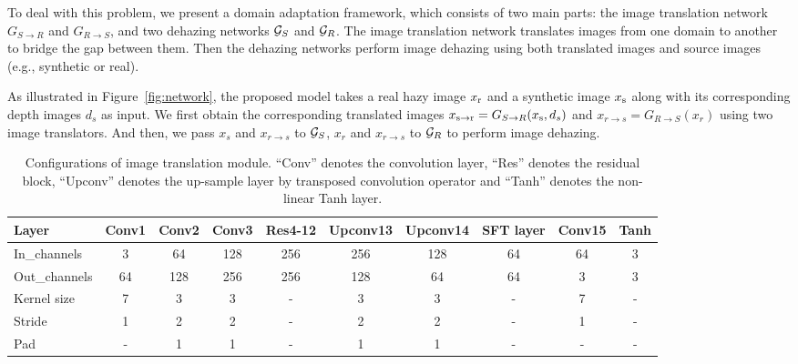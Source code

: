 \documentclass[10pt,twocolumn,letterpaper]{article}
\begin{document}
To deal with this problem, we present a domain adaptation framework, which consists of two main parts: the image translation network ${G_{S \to R}}$ and ${G_{R \to S}}$, and two dehazing networks ${{\cal G}_S}$ and ${{\cal G}_R}$. 
The image translation network translates images from one domain to another to bridge the gap between them.
Then the dehazing networks perform image dehazing using both translated images and source images (e.g., synthetic or real).

As illustrated in Figure~\ref{fig:network}, the proposed model takes a real hazy image ${x_{\rm{r}}}$ and a synthetic image ${x_{\rm{s}}}$ along with its corresponding depth images ${d_s}$ as input. 
We first obtain the corresponding translated images ${x_{{\rm{s}} \to {\rm{r}}}} = {G_{S \to R}}({x_{\rm{s}}},{d_s})$ and ${x_{r \to s}} = {G_{R \to S}}({x_r})$ using two image translators. 
And then, we pass ${x_s}$ and ${x_{r \to s}}$ to ${{\cal G}_S}$, ${x_r}$ and ${x_{r \to s}}$ to ${{\cal G}_R}$ to perform image dehazing.
 
\begin{table*}[t]
\footnotesize
\caption{Configurations of image translation module.
``Conv'' denotes the convolution layer, ``Res'' denotes the residual block, ``Upconv'' denotes the up-sample layer by transposed convolution operator and ``Tanh'' denotes the non-linear Tanh layer.}
\vspace{2mm}
\label{tab:tran_s2r}
\centering
\begin{tabular}{l|c|c|c|c|c|c|c|c|c}
\toprule
Layer        & Conv1 & Conv2 & Conv3   & Res4-12   & Upconv13  & Upconv14   & SFT layer  & Conv15 & Tanh  \\ \midrule
In\_channels  & 3     & 64    & 128      & 256      & 256      	& 128         & 64       & 64     & 3    \\
Out\_channels & 64    & 128   & 256      & 256      & 128       & 64          & 64       & 3      & 3    \\
Kernel size   & 7     & 3     & 3        & -        & 3        	& 3           & -        & 7      & -     \\
Stride        & 1     & 2     & 2        & -        & 2        	& 2           & -        & 1      & -     \\
Pad           & -     & 1     & 1        & -        & 1        	& 1           & -        & -      & -     \\ \bottomrule
\end{tabular}
\end{table*}
\end{document}
